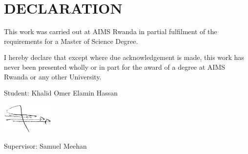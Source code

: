\chapter*{DECLARATION}
This work was carried out at AIMS Rwanda in partial fulfilment of the requirements for a Master of Science Degree.

I hereby declare that except where due acknowledgement is made, this work has never been presented wholly or in part for the award of a degree at AIMS Rwanda or any other University.

\vspace{1.5cm}

Student: Khalid Omer Elamin Hassan

\includegraphics[height=1.5cm]{images/sign.png}

\vspace{1.5cm}

Supervisor: Samuel Meehan


%
%
%
%
